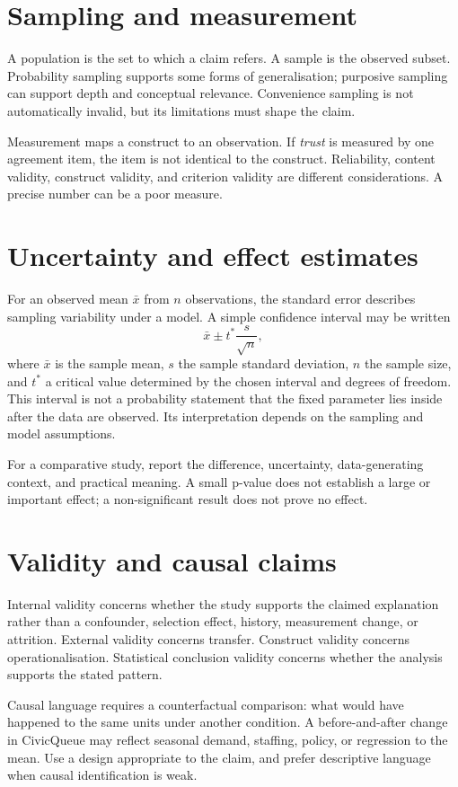 \section{Sampling and measurement}
A population is the set to which a claim refers. A sample is the observed subset. Probability sampling supports some forms of generalisation; purposive sampling can support depth and conceptual relevance. Convenience sampling is not automatically invalid, but its limitations must shape the claim.

Measurement maps a construct to an observation. If \emph{trust} is measured by one agreement item, the item is not identical to the construct. Reliability, content validity, construct validity, and criterion validity are different considerations. A precise number can be a poor measure.

\section{Uncertainty and effect estimates}
For an observed mean $\bar x$ from $n$ observations, the standard error describes sampling variability under a model. A simple confidence interval may be written
\[
\bar x \pm t^\ast\frac{s}{\sqrt n},
\]
where $\bar x$ is the sample mean, $s$ the sample standard deviation, $n$ the sample size, and $t^\ast$ a critical value determined by the chosen interval and degrees of freedom. This interval is not a probability statement that the fixed parameter lies inside after the data are observed. Its interpretation depends on the sampling and model assumptions.

For a comparative study, report the difference, uncertainty, data-generating context, and practical meaning. A small p-value does not establish a large or important effect; a non-significant result does not prove no effect.

\section{Validity and causal claims}
Internal validity concerns whether the study supports the claimed explanation rather than a confounder, selection effect, history, measurement change, or attrition. External validity concerns transfer. Construct validity concerns operationalisation. Statistical conclusion validity concerns whether the analysis supports the stated pattern.

Causal language requires a counterfactual comparison: what would have happened to the same units under another condition. A before-and-after change in CivicQueue may reflect seasonal demand, staffing, policy, or regression to the mean. Use a design appropriate to the claim, and prefer descriptive language when causal identification is weak.

